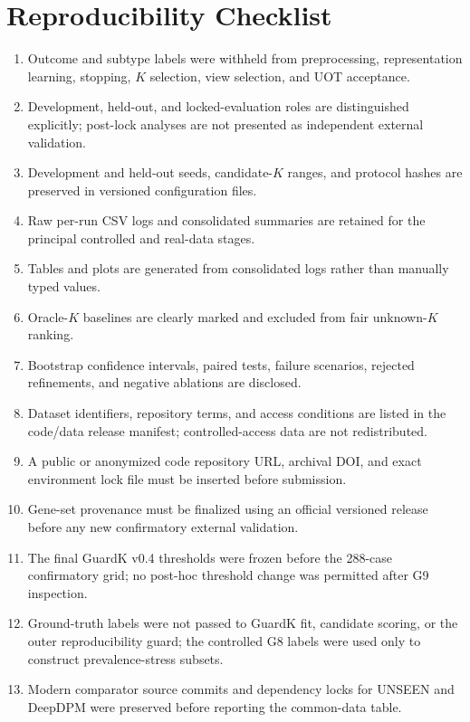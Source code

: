 \section{Reproducibility Checklist}\label{app:reproducibility}
\begin{enumerate}[leftmargin=2em,itemsep=2pt]
\item Outcome and subtype labels were withheld from preprocessing, representation learning, stopping, $K$ selection, view selection, and UOT acceptance.
\item Development, held-out, and locked-evaluation roles are distinguished explicitly; post-lock analyses are not presented as independent external validation.
\item Development and held-out seeds, candidate-$K$ ranges, and protocol hashes are preserved in versioned configuration files.
\item Raw per-run CSV logs and consolidated summaries are retained for the principal controlled and real-data stages.
\item Tables and plots are generated from consolidated logs rather than manually typed values.
\item Oracle-$K$ baselines are clearly marked and excluded from fair unknown-$K$ ranking.
\item Bootstrap confidence intervals, paired tests, failure scenarios, rejected refinements, and negative ablations are disclosed.
\item Dataset identifiers, repository terms, and access conditions are listed in the code/data release manifest; controlled-access data are not redistributed.
\item A public or anonymized code repository URL, archival DOI, and exact environment lock file must be inserted before submission.
\item Gene-set provenance must be finalized using an official versioned release before any new confirmatory external validation.
\item The final GuardK v0.4 thresholds were frozen before the 288-case confirmatory grid; no post-hoc threshold change was permitted after G9 inspection.
\item Ground-truth labels were not passed to GuardK fit, candidate scoring, or the outer reproducibility guard; the controlled G8 labels were used only to construct prevalence-stress subsets.
\item Modern comparator source commits and dependency locks for UNSEEN and DeepDPM were preserved before reporting the common-data table.
\end{enumerate}

